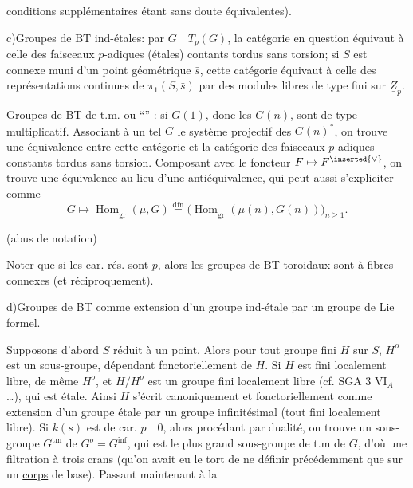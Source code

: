 
conditions supplémentaires étant sans doute équivalentes).

c)\quad Groupes de BT ind-étales: par $G\quad T_p(G)$,  la catégorie en question équivaut à celle des faisceaux $p$-adiques (étales) contants tordus  sans torsion; si $S$ est connexe muni d'un point géométrique $\bar{s}$, cette catégorie équivaut à celle des représentations continues de $\pi_1(S,\bar{s})$ par des modules libres de type fini sur $\underline{Z}_p$.

Groupes de BT de t.m. ou ``'' : si $G(1)$, donc les $G(n)$, sont de type multiplicatif. Associant à un tel $G$ le système projectif des $G(n)^*$, on trouve  une équivalence entre cette catégorie et la catégorie des faisceaux $p$-adiques constants tordus sans torsion. Composant avec le foncteur $F\mapsto F^{\inserted{\vee}}$, on trouve une équivalence au lieu d'une antiéquivalence, qui peut aussi s'expliciter comme 
\[
G\longmapsto\underline{\operatorname{Hom}}_{\mathrm{gr}}(\mu,G)
\overset{\mathrm{dfn}}{=}
\bigl(\underline{\operatorname{Hom}}_{\mathrm{gr}}(\mu(n),G(n))\bigr)_{n\geq1}.
\]
\begin{center}(abus de notation)\end{center}
Noter que si les car. rés. sont $p$, alors les groupes de BT toroidaux sont  à fibres connexes (et réciproquement).

d)\quad Groupes de BT comme extension d'un groupe ind-étale par un groupe de Lie formel.

Supposons d'abord $S$  réduit à un point. Alors pour tout groupe fini $H$ sur $S$, $H^o$ est un sous-groupe, dépendant fonctoriellement de $H$. Si $H$ est fini localement libre, de même $H^o$, et $H/H^o$ est  un groupe fini localement libre (cf. SGA 3 $\mathrm{VI}_A$ \ldots), qui est étale. Ainsi $H$ s'écrit canoniquement et fonctoriellement comme extension d'un groupe étale par un groupe infinitésimal (tout fini localement libre). Si $k(s)$ est de car. $p\quad0$, alors procédant par dualité, on trouve un sous-groupe $G^{\mathrm{tm}}$ de $G^o=G^{\mathrm{inf}}$, qui est le plus grand sous-groupe de t.m de $G$, d'où une filtration à trois crans (qu'on avait eu le tort de ne définir précédemment que sur un \uline{corps}  de base). Passant maintenant à la
